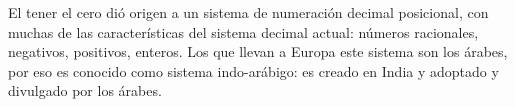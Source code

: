 El tener el cero dió origen a un sistema de numeración decimal posicional, con muchas de las características del sistema decimal actual: números racionales, negativos, positivos, enteros. Los que llevan a Europa este sistema son los árabes, por eso es conocido como sistema indo-arábigo: es creado en India y adoptado y divulgado por los árabes. 